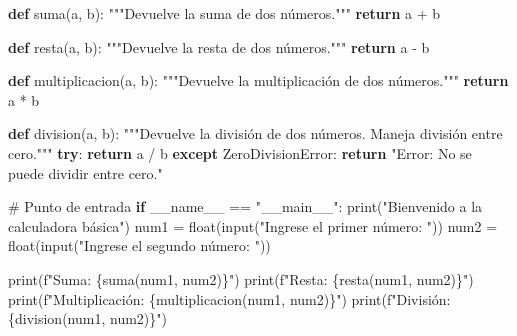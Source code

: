 \documentclass[
  a4paper,
  DIV=11,
  numbers=noendperiod,
  onepage,
  openany]{scrreprt}
\newenvironment{Shaded}{\begin{snugshade}}{\end{snugshade}}
\newcommand{\BuiltInTok}[1]{\textcolor[rgb]{0.00,0.23,0.31}{#1}}
\newcommand{\CommentTok}[1]{\textcolor[rgb]{0.37,0.37,0.37}{#1}}
\newcommand{\ControlFlowTok}[1]{\textcolor[rgb]{0.00,0.23,0.31}{\textbf{#1}}}
\newcommand{\KeywordTok}[1]{\textcolor[rgb]{0.00,0.23,0.31}{\textbf{#1}}}
\newcommand{\NormalTok}[1]{\textcolor[rgb]{0.00,0.23,0.31}{#1}}
\newcommand{\OperatorTok}[1]{\textcolor[rgb]{0.37,0.37,0.37}{#1}}
\newcommand{\PreprocessorTok}[1]{\textcolor[rgb]{0.68,0.00,0.00}{#1}}
\newcommand{\SpecialCharTok}[1]{\textcolor[rgb]{0.37,0.37,0.37}{#1}}
\newcommand{\SpecialStringTok}[1]{\textcolor[rgb]{0.13,0.47,0.30}{#1}}
\newcommand{\StringTok}[1]{\textcolor[rgb]{0.13,0.47,0.30}{#1}}
\newcommand{\VariableTok}[1]{\textcolor[rgb]{0.07,0.07,0.07}{#1}}
\begin{document}
\begin{Shaded}
\begin{Highlighting}[]
\KeywordTok{def}\NormalTok{ suma(a, b):}
    \CommentTok{"""Devuelve la suma de dos números."""}
    \ControlFlowTok{return}\NormalTok{ a }\OperatorTok{+}\NormalTok{ b}


\KeywordTok{def}\NormalTok{ resta(a, b):}
    \CommentTok{"""Devuelve la resta de dos números."""}
    \ControlFlowTok{return}\NormalTok{ a }\OperatorTok{{-}}\NormalTok{ b}


\KeywordTok{def}\NormalTok{ multiplicacion(a, b):}
    \CommentTok{"""Devuelve la multiplicación de dos números."""}
    \ControlFlowTok{return}\NormalTok{ a }\OperatorTok{*}\NormalTok{ b}


\KeywordTok{def}\NormalTok{ division(a, b):}
    \CommentTok{"""Devuelve la división de dos números. Maneja división entre cero."""}
    \ControlFlowTok{try}\NormalTok{:}
        \ControlFlowTok{return}\NormalTok{ a }\OperatorTok{/}\NormalTok{ b}
    \ControlFlowTok{except} \PreprocessorTok{ZeroDivisionError}\NormalTok{:}
        \ControlFlowTok{return} \StringTok{"Error: No se puede dividir entre cero."}


\CommentTok{\# Punto de entrada}
\ControlFlowTok{if} \VariableTok{\_\_name\_\_} \OperatorTok{==} \StringTok{"\_\_main\_\_"}\NormalTok{:}
    \BuiltInTok{print}\NormalTok{(}\StringTok{"Bienvenido a la calculadora básica"}\NormalTok{)}
\NormalTok{    num1 }\OperatorTok{=} \BuiltInTok{float}\NormalTok{(}\BuiltInTok{input}\NormalTok{(}\StringTok{"Ingrese el primer número: "}\NormalTok{))}
\NormalTok{    num2 }\OperatorTok{=} \BuiltInTok{float}\NormalTok{(}\BuiltInTok{input}\NormalTok{(}\StringTok{"Ingrese el segundo número: "}\NormalTok{))}

    \BuiltInTok{print}\NormalTok{(}\SpecialStringTok{f"Suma: }\SpecialCharTok{\{}\NormalTok{suma(num1, num2)}\SpecialCharTok{\}}\SpecialStringTok{"}\NormalTok{)}
    \BuiltInTok{print}\NormalTok{(}\SpecialStringTok{f"Resta: }\SpecialCharTok{\{}\NormalTok{resta(num1, num2)}\SpecialCharTok{\}}\SpecialStringTok{"}\NormalTok{)}
    \BuiltInTok{print}\NormalTok{(}\SpecialStringTok{f"Multiplicación: }\SpecialCharTok{\{}\NormalTok{multiplicacion(num1, num2)}\SpecialCharTok{\}}\SpecialStringTok{"}\NormalTok{)}
    \BuiltInTok{print}\NormalTok{(}\SpecialStringTok{f"División: }\SpecialCharTok{\{}\NormalTok{division(num1, num2)}\SpecialCharTok{\}}\SpecialStringTok{"}\NormalTok{)}
\end{Highlighting}
\end{Shaded}
\end{document}

